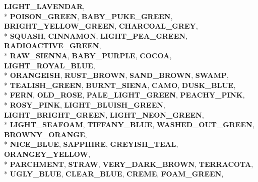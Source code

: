 \begin{DoxyCompactItemize}
{\bfseries L\+I\+G\+H\+T\+\_\+\+L\+A\+V\+E\+N\+D\+AR}, 
\\*
{\bfseries P\+O\+I\+S\+O\+N\+\_\+\+G\+R\+E\+EN}, 
{\bfseries B\+A\+B\+Y\+\_\+\+P\+U\+K\+E\+\_\+\+G\+R\+E\+EN}, 
{\bfseries B\+R\+I\+G\+H\+T\+\_\+\+Y\+E\+L\+L\+O\+W\+\_\+\+G\+R\+E\+EN}, 
{\bfseries C\+H\+A\+R\+C\+O\+A\+L\+\_\+\+G\+R\+EY}, 
\\*
{\bfseries S\+Q\+U\+A\+SH}, 
{\bfseries C\+I\+N\+N\+A\+M\+ON}, 
{\bfseries L\+I\+G\+H\+T\+\_\+\+P\+E\+A\+\_\+\+G\+R\+E\+EN}, 
{\bfseries R\+A\+D\+I\+O\+A\+C\+T\+I\+V\+E\+\_\+\+G\+R\+E\+EN}, 
\\*
{\bfseries R\+A\+W\+\_\+\+S\+I\+E\+N\+NA}, 
{\bfseries B\+A\+B\+Y\+\_\+\+P\+U\+R\+P\+LE}, 
{\bfseries C\+O\+C\+OA}, 
{\bfseries L\+I\+G\+H\+T\+\_\+\+R\+O\+Y\+A\+L\+\_\+\+B\+L\+UE}, 
\\*
{\bfseries O\+R\+A\+N\+G\+E\+I\+SH}, 
{\bfseries R\+U\+S\+T\+\_\+\+B\+R\+O\+WN}, 
{\bfseries S\+A\+N\+D\+\_\+\+B\+R\+O\+WN}, 
{\bfseries S\+W\+A\+MP}, 
\\*
{\bfseries T\+E\+A\+L\+I\+S\+H\+\_\+\+G\+R\+E\+EN}, 
{\bfseries B\+U\+R\+N\+T\+\_\+\+S\+I\+E\+NA}, 
{\bfseries C\+A\+MO}, 
{\bfseries D\+U\+S\+K\+\_\+\+B\+L\+UE}, 
\\*
{\bfseries F\+E\+RN}, 
{\bfseries O\+L\+D\+\_\+\+R\+O\+SE}, 
{\bfseries P\+A\+L\+E\+\_\+\+L\+I\+G\+H\+T\+\_\+\+G\+R\+E\+EN}, 
{\bfseries P\+E\+A\+C\+H\+Y\+\_\+\+P\+I\+NK}, 
\\*
{\bfseries R\+O\+S\+Y\+\_\+\+P\+I\+NK}, 
{\bfseries L\+I\+G\+H\+T\+\_\+\+B\+L\+U\+I\+S\+H\+\_\+\+G\+R\+E\+EN}, 
{\bfseries L\+I\+G\+H\+T\+\_\+\+B\+R\+I\+G\+H\+T\+\_\+\+G\+R\+E\+EN}, 
{\bfseries L\+I\+G\+H\+T\+\_\+\+N\+E\+O\+N\+\_\+\+G\+R\+E\+EN}, 
\\*
{\bfseries L\+I\+G\+H\+T\+\_\+\+S\+E\+A\+F\+O\+AM}, 
{\bfseries T\+I\+F\+F\+A\+N\+Y\+\_\+\+B\+L\+UE}, 
{\bfseries W\+A\+S\+H\+E\+D\+\_\+\+O\+U\+T\+\_\+\+G\+R\+E\+EN}, 
{\bfseries B\+R\+O\+W\+N\+Y\+\_\+\+O\+R\+A\+N\+GE}, 
\\*
{\bfseries N\+I\+C\+E\+\_\+\+B\+L\+UE}, 
{\bfseries S\+A\+P\+P\+H\+I\+RE}, 
{\bfseries G\+R\+E\+Y\+I\+S\+H\+\_\+\+T\+E\+AL}, 
{\bfseries O\+R\+A\+N\+G\+E\+Y\+\_\+\+Y\+E\+L\+L\+OW}, 
\\*
{\bfseries P\+A\+R\+C\+H\+M\+E\+NT}, 
{\bfseries S\+T\+R\+AW}, 
{\bfseries V\+E\+R\+Y\+\_\+\+D\+A\+R\+K\+\_\+\+B\+R\+O\+WN}, 
{\bfseries T\+E\+R\+R\+A\+C\+O\+TA}, 
\\*
{\bfseries U\+G\+L\+Y\+\_\+\+B\+L\+UE}, 
{\bfseries C\+L\+E\+A\+R\+\_\+\+B\+L\+UE}, 
{\bfseries C\+R\+E\+ME}, 
{\bfseries F\+O\+A\+M\+\_\+\+G\+R\+E\+EN}, 

\end{DoxyCompactItemize}
